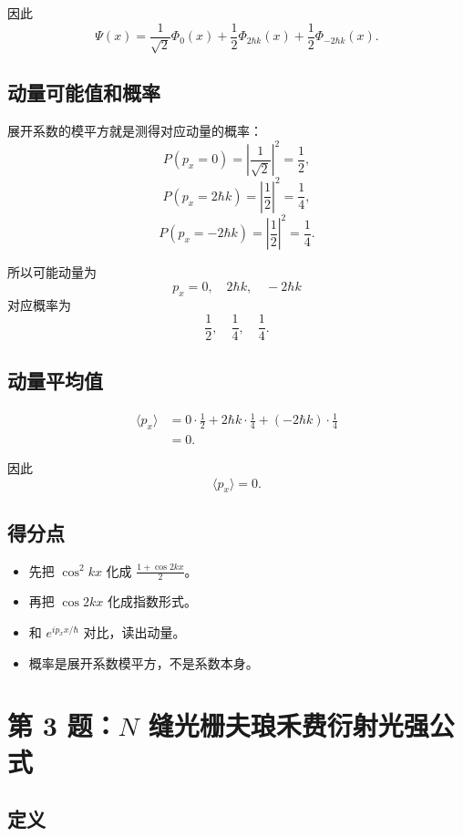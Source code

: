 \documentclass[12pt,a4paper]{ctexart}
\begin{document}
因此
\[
\boxed{
\Psi(x)=
\frac{1}{\sqrt{2}}\Phi_0(x)
+\frac{1}{2}\Phi_{2\hbar k}(x)
+\frac{1}{2}\Phi_{-2\hbar k}(x)
}.
\]

\subsection*{动量可能值和概率}

展开系数的模平方就是测得对应动量的概率：
\[
P(p_x=0)=\left|\frac{1}{\sqrt{2}}\right|^2=\frac{1}{2},
\]
\[
P(p_x=2\hbar k)=\left|\frac{1}{2}\right|^2=\frac{1}{4},
\]
\[
P(p_x=-2\hbar k)=\left|\frac{1}{2}\right|^2=\frac{1}{4}.
\]

所以可能动量为
\[
\boxed{
p_x=0,\quad 2\hbar k,\quad -2\hbar k
}
\]
对应概率为
\[
\boxed{
\frac{1}{2},\quad \frac{1}{4},\quad \frac{1}{4}
}.
\]

\subsection*{动量平均值}

\[
\begin{aligned}
\langle p_x\rangle
&=0\cdot\frac{1}{2}
+2\hbar k\cdot\frac{1}{4}
+(-2\hbar k)\cdot\frac{1}{4}\\
&=0.
\end{aligned}
\]

因此
\[
\boxed{\langle p_x\rangle=0}.
\]

\subsection*{得分点}

\begin{itemize}
  \item 先把 $\cos^2kx$ 化成 $\frac{1+\cos2kx}{2}$。
  \item 再把 $\cos2kx$ 化成指数形式。
  \item 和 $e^{ip_xx/\hbar}$ 对比，读出动量。
  \item 概率是展开系数模平方，不是系数本身。
\end{itemize}

\section*{第 3 题：$N$ 缝光栅夫琅禾费衍射光强公式}

\subsection*{定义}
\end{document}
